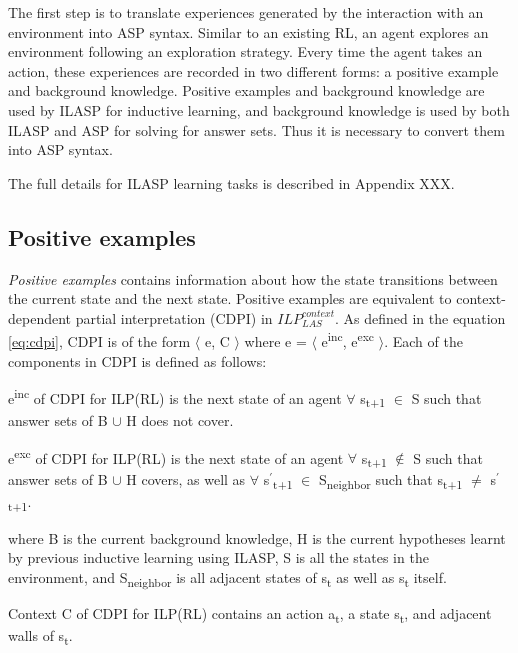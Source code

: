 The first step is to translate experiences generated by the interaction with an environment into ASP syntax. 
Similar to an existing RL, an agent explores an environment following an exploration strategy.
Every time the agent takes an action, these experiences are recorded in two different forms: 
a positive example and background knowledge. 
Positive examples and background knowledge are used by ILASP for inductive learning, and background knowledge is used by both ILASP and ASP for solving for answer sets.
Thus it is necessary to convert them into ASP syntax.

The full details for ILASP learning tasks is described in Appendix XXX.

\subsection{Positive examples}
\textit{Positive examples} contains information about how the state transitions between the current state and the next state.
Positive examples are equivalent to context-dependent partial interpretation (CDPI) in  $ILP_{LAS}^{context}$. 
As defined in the equation \ref{eq:cdpi}, CDPI is of the form $\langle$ e, C $\rangle$ where e = $\langle$ e\textsuperscript{inc}, e\textsuperscript{exc} $\rangle$. 
Each of the components in CDPI is defined as follows:
\begin{defn}
e\textsuperscript{inc} of CDPI for ILP(RL) is the next state of an agent $\forall$ s\textsubscript{t+1} $\in$ S such that answer sets of B $\cup$ H does not cover.
\end{defn}

\begin{defn}
e\textsuperscript{exc} of CDPI for ILP(RL) is the next state of an agent $\forall$ s\textsubscript{t+1} $\not\in$ S such that answer sets of B $\cup$ H covers,
as well as $\forall$ s$^\prime$\textsubscript{t+1} $\in$ S\textsubscript{neighbor} such that s\textsubscript{t+1} $\neq$ s$^\prime$\textsubscript{t+1}.
\end{defn}
where B is the current background knowledge, H is the current hypotheses learnt by previous inductive learning using ILASP, S is all the states in the environment, and S\textsubscript{neighbor} is all adjacent states of s\textsubscript{t} as well as s\textsubscript{t} itself.

\begin{defn}
Context C of CDPI for ILP(RL) contains an action a\textsubscript{t}, a state s\textsubscript{t}, and adjacent walls of s\textsubscript{t}.
\label{def:context}
\end{defn}

